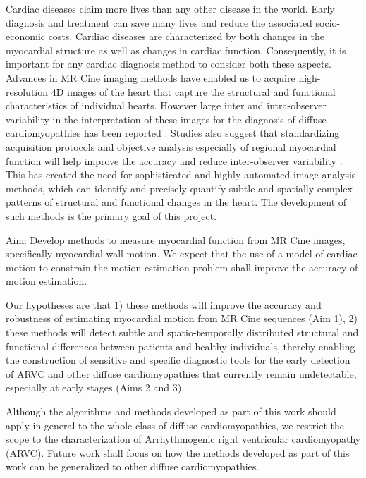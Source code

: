 Cardiac diseases claim more lives than any other disease in the world. Early diagnosis and
treatment can save many lives and reduce the associated socio-economic costs. Cardiac diseases
are characterized by both changes in the myocardial structure as well as changes in cardiac
function. Consequently, it is important for any cardiac diagnosis method to consider both these
aspects. Advances in MR Cine imaging methods have enabled us to acquire high-resolution 4D
images of the heart that capture the structural and functional characteristics of individual hearts.
However large inter and intra-observer variability in the interpretation of these images for the
diagnosis of diffuse cardiomyopathies has been reported \cite{bluemke03}. Studies also suggest that
standardizing acquisition protocols and objective analysis especially of regional myocardial
function will help improve the accuracy and reduce inter-observer variability \cite{pattynama93}. This has
created the need for sophisticated and highly automated image analysis methods, which can
identify and precisely quantify subtle and spatially complex patterns of structural and functional
changes in the heart. The development of such methods is the primary goal of this project.

Aim: Develop methods to measure myocardial function from MR Cine images, specifically
myocardial wall motion. We expect that the use of a model of cardiac motion to constrain the
motion estimation problem shall improve the accuracy of motion estimation.

Our hypotheses are that 1) these methods will improve the accuracy and robustness of estimating
myocardial motion from MR Cine sequences (Aim 1), 2) these methods will detect subtle and
spatio-temporally distributed structural and functional differences between patients and healthy
individuals, thereby enabling the construction of sensitive and specific diagnostic tools for the
early detection of ARVC and other diffuse cardiomyopathies that currently remain undetectable,
especially at early stages (Aims 2 and 3).

Although the algorithms and methods developed as part of this work should apply in general to
the whole class of diffuse cardiomyopathies, we restrict the scope to the characterization of
Arrhythmogenic right ventricular cardiomyopathy (ARVC). Future work shall focus on how the
methods developed as part of this work can be generalized to other diffuse cardiomyopathies.

